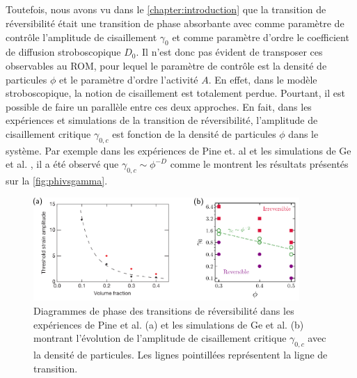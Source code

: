\subparagraph{}Toutefois, nous avons vu dans le \autoref{chapter:introduction} que la transition de réversibilité était une transition de phase absorbante avec comme paramètre de contrôle l'amplitude de cisaillement $\gamma_0$ et comme paramètre d'ordre le coefficient de diffusion stroboscopique $D_0$. Il n'est donc pas évident de transposer ces observables au ROM, pour lequel le paramètre de contrôle est la densité de particules $\phi$  et le paramètre d'ordre l'activité $A$. En effet, dans le modèle stroboscopique, la notion de cisaillement est totalement perdue. Pourtant, il est possible de faire un parallèle entre ces deux approches. En fait, dans les expériences et simulations de la transition de réversibilité, l'amplitude de cisaillement critique $\gamma_{0,c}$ est fonction de la densité de particules $\phi$ dans le système. Par exemple dans les expériences de Pine et. al \cite{pine_chaos_2005} et les simulations de Ge et al. \cite{ge_rheology_2022}, il a été observé que $\gamma_{0,c}\sim \phi^{-D}$ comme le montrent les résultats présentés sur la \autoref{fig:phivsgamma}.

\begin{figure}[h]
	\centering
	\includegraphics[width=0.9\textwidth]{Chapitre3/Figures/Method/phivsgamma.pdf}
	\caption{Diagrammes de phase des transitions de réversibilité dans les expériences de Pine et al. \cite{pine_chaos_2005} (a) et les simulations de Ge et al. \cite{ge_rheology_2022} (b) montrant l'évolution de l'amplitude de cisaillement critique $\gamma_{0,c}$ avec la densité de particules. Les lignes pointillées représentent la ligne de transition.}
	\label{fig:phivsgamma}
\end{figure}

